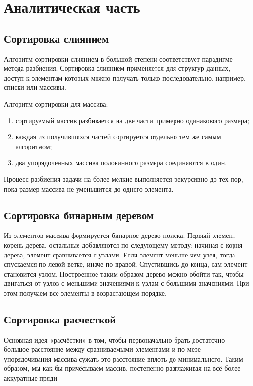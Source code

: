 \chapter{Аналитическая часть}

\section{Сортировка слиянием}

Алгоритм сортировки слиянием в большой степени соответствует парадигме метода разбиения\cite{merge_sort}. 
Сортировка слиянием применяется для структур данных, доступ к элементам которых можно получать только последовательно, например, списки или массивы.

Алгоритм сортировки для массива:

\begin{enumerate}[label={\arabic*)}]
	\item сортируемый массив разбивается на две части примерно одинакового размера;
	\item каждая из получившихся частей сортируется отдельно тем же самым алгоритмом;
	\item два упорядоченных массива половинного размера соединяются в один.
\end{enumerate}

Процесс разбиения задачи на более мелкие выполняется рекурсивно до тех пор, пока размер массива не уменьшится до одного элемента. 

\section{Сортировка бинарным деревом}

Из элементов массива формируется бинарное дерево поиска. 
Первый элемент -- корень дерева, остальные добавляются по следующему методу: начиная с корня дерева, элемент сравнивается с узлами. 
Если элемент меньше чем узел, тогда спускаемся по левой ветке, иначе по правой. 
Спустившись до конца, сам элемент становится узлом. 
Построенное таким образом дерево можно обойти так, чтобы двигаться от узлов с меньшими значениями к узлам с большими значениями. 
При этом получаем все элементы в возрастающем порядке\cite{bin_tree}.

\section{Сортировка расчесткой}

Основная идея «расчёстки» в том, чтобы первоначально брать достаточно большое расстояние между сравниваемыми элементами и по мере упорядочивания массива сужать это расстояние вплоть до минимального. 
Таким образом, мы как бы причёсываем массив, постепенно разглаживая на всё более аккуратные пряди. 

